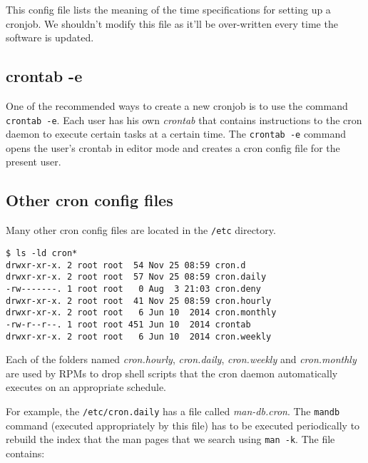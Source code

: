 This config file lists the meaning of the time specifications for setting up a cronjob. We shouldn't modify this file as it'll be over-written every time the software is updated. 

\subsection{crontab -e}
One of the recommended ways to create a new cronjob is to use the command \verb|crontab -e|. Each user has his own \textit{crontab} that contains instructions to the cron daemon to execute certain tasks at a certain time. The \verb|crontab -e| command opens the user's crontab in editor mode and creates a cron config file for the present user. 

\subsection{Other cron config files}
Many other cron config files are located in the \verb|/etc| directory. 

\vspace{-15pt}
\begin{verbatim}
$ ls -ld cron*
drwxr-xr-x. 2 root root  54 Nov 25 08:59 cron.d
drwxr-xr-x. 2 root root  57 Nov 25 08:59 cron.daily
-rw-------. 1 root root   0 Aug  3 21:03 cron.deny
drwxr-xr-x. 2 root root  41 Nov 25 08:59 cron.hourly
drwxr-xr-x. 2 root root   6 Jun 10  2014 cron.monthly
-rw-r--r--. 1 root root 451 Jun 10  2014 crontab
drwxr-xr-x. 2 root root   6 Jun 10  2014 cron.weekly
\end{verbatim}
\vspace{-10pt}

\noindent
Each of the folders named \textit{cron.hourly}, \textit{cron.daily}, \textit{cron.weekly} and \textit{cron.monthly} are used by RPMs to drop shell scripts that the cron daemon automatically executes on an appropriate schedule. 

For example, the \verb|/etc/cron.daily| has a file called \textit{man-db.cron}. The \verb|mandb| command (executed appropriately by this file) has to be executed periodically to rebuild the index that the man pages that we search using \verb|man -k|. The file contains:

